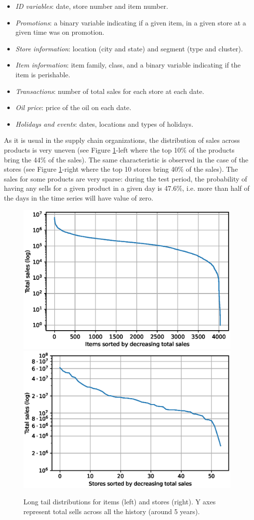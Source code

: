 \begin{itemize}
	\item \textit{ID variables}: date, store number and item number.
	\item \textit{Promotions}: a binary variable indicating if a given item, in a given store at a given time was on promotion.
	\item \textit{Store information}: location (city and state) and segment (type and cluster).
	\item \textit{Item information}: item family, class, and a binary variable indicating if the item is perishable.
	\item \textit{Transactions}: number of total sales for each store at each date.
	\item \textit{Oil price}: price of the oil on each date.
	\item \textit{Holidays and events}: dates, locations and types of holidays.
\end{itemize}

As it is usual in the supply chain organizations, the distribution of sales across products is very uneven (see Figure \ref{fig:tails}-left where the top 10\% of the products bring the 44\% of the sales). The same characteristic is observed in the case of the stores (see Figure \ref{fig:tails}-right where the top 10 stores bring 40\% of the sales). The sales for some products are very sparse: during the test period, the probability of having any sells for a given product in a given day is 47.6\%, i.e. more than half of the days in the time series will have value of zero.

\begin{figure}
	\centering
	\includegraphics[width=0.48\linewidth]{salesforecast/images/items_tail_log}
	\includegraphics[width=0.48\linewidth]{salesforecast/images/stores_tail_log}
	\caption[Long tail distributions of sales across items and stores]{Long tail distributions for items (left) and stores (right). Y axes represent total sells across all the history (around 5 years).}
	\label{fig:tails}
\end{figure}

